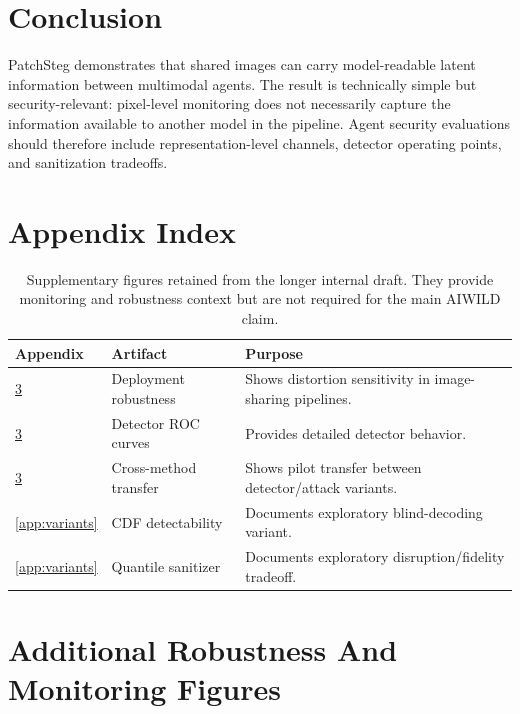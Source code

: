 \documentclass{article}
\begin{document}
\section{Conclusion}

PatchSteg demonstrates that shared images can carry model-readable latent information between multimodal agents. The result is technically simple but security-relevant: pixel-level monitoring does not necessarily capture the information available to another model in the pipeline. Agent security evaluations should therefore include representation-level channels, detector operating points, and sanitization tradeoffs.




\clearpage
\appendix

\section{Appendix Index}

\begin{table}[t]
\caption{Supplementary figures retained from the longer internal draft. They provide monitoring and robustness context but are not required for the main AIWILD claim.}
\label{tab:appendix_index}
\centering
\begin{small}
\begin{tabular}{lll}
\toprule
Appendix & Artifact & Purpose \\
\midrule
\ref{app:monitoring} & Deployment robustness & Shows distortion sensitivity in image-sharing pipelines. \\
\ref{app:monitoring} & Detector ROC curves & Provides detailed detector behavior. \\
\ref{app:monitoring} & Cross-method transfer & Shows pilot transfer between detector/attack variants. \\
\ref{app:variants} & CDF detectability & Documents exploratory blind-decoding variant. \\
\ref{app:variants} & Quantile sanitizer & Documents exploratory disruption/fidelity tradeoff. \\
\bottomrule
\end{tabular}
\end{small}
\end{table}

\clearpage
\section{Additional Robustness And Monitoring Figures}
\label{app:monitoring}
\end{document}
